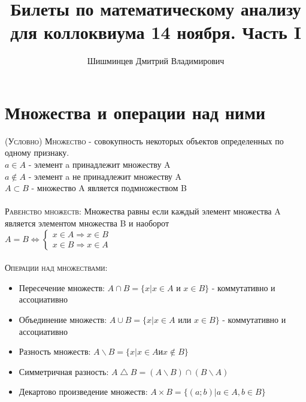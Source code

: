 \documentclass[14pt]{article}
\title{Билеты по математическому анализу для коллоквиума 14 ноября. Часть I }
\author{Шишминцев Дмитрий Владимирович}
\begin{document}
    \maketitle
    \tableofcontents
    \newpage
    
    \section{Множества и операции над ними}
        \textsc{(Условно) Множество  }
         - совокупность некоторых объектов определенных по одному признаку. \\
        $ a \in A $ - элемент a принадлежит множеству A \\ 
        $ a \notin A $ - элемент a не принадлежит множеству A \\ 
        $ A \subset B $ - множество A является подмножеством B \\
        \\
        \textsc{Равенство множеств: } Множества равны если каждый элемент множества A является элементом множества B и наоборот \\
        $A = B \Leftrightarrow \begin{cases}
            x \in A \Rightarrow x \in B \\ 
            x \in B \Rightarrow x \in A
        \end{cases}$\\
        \\
        \textsc{Операции над множествами:}
        \begin{itemize}
            \item Пересечение множеств: $ A \cap B = \{ x| x \in A$ и $x \in B \}$ - коммутативно и ассоциативно
            \item Объединение множеств: $ A \cup B = \{ x | x \in A$ или $x \in B \}$ - коммутативно и ассоциативно
            \item Разность множеств: $ A \backslash B = \{ x | x \in A $и$ x \notin B \} $
            \item Симметричная разность: $ A \bigtriangleup B = (A \backslash B) \cap (B \backslash A)$
            \item Декартово произведение множеств: $ A \times B = \{(a; b) | a \in A, b \in B \}$
        \end{itemize}
           
\end{document}
